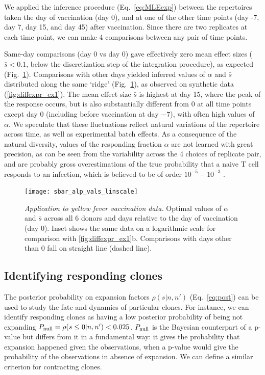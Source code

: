 \documentclass[pre,twocolumn,english,longbibliography]{revtex4}
\newcommand{\<}{\langle}
\renewcommand{\>}{\rangle}
\begin{document}
We applied the inference procedure (Eq.~\ref{eq:MLEexp}) between the repertoires taken the day of vaccination (day 0), and at one of the other time points (day -7, day 7, day 15, and day 45) after vaccination. Since there are two replicates at each time point, we can make 4 comparisons between any pair of time points.

Same-day comparisons (day 0 vs day 0) gave effectively zero mean effect sizes ($\bar s<0.1$, below the discretization step of the integration procedure), as expected (Fig.~\ref{fig:diffexpr_ex2}). Comparisons with other days yielded inferred values of $\alpha$ and $\bar s$ distributed along the same  `ridge' (Fig.~\ref{fig:diffexpr_ex2}), as observed on synthetic data (\cref{fig:diffexpr_ex1}). The mean effect size $\bar s$ is highest at day 15, where the peak of the response occurs, but is also substantially different from 0 at all time points except day 0 (including before vaccination at day $-7$), with often high values of $\alpha$. We speculate that these fluctuations reflect natural variations of the repertoire across time, as well as experimental batch effects. As a consequence of the natural diversity, 
values of the responding fraction $\alpha$ are not learned with great precision, as can be seen from the variability across the 4 choices of replicate pair, and are probably gross overestimations of the true probability that a naive T cell responds to an infection, which is believed to be of order $10^{-5}-10^{-3}$ \cite{Boer1993}.

\begin{figure}
\texttt{[image: sbar\_alp\_vals\_linscale]}
\centering{}
\caption{
\emph{Application to yellow fever vaccination data.} Optimal values of $\alpha$ and $\bar{s}$ across all 6 donors and days relative to the day of vaccination (day 0). Inset shows the same data on a logarithmic scale for comparison with \cref{fig:diffexpr_ex1}b. Comparisons with days other than 0 fall on straight line (dashed line).
\label{fig:diffexpr_ex2}
}
\end{figure}


\subsection*{Identifying responding clones}

The posterior probability on expansion factors $\rho(s|n,n')$ (Eq.~\ref{eq:post}) can be used to
study the fate and dynamics of particular clones. For instance, we can
identify responding clones as having a low posterior probability of being not expanding $P_{\rm null}=\rho(s\leq 0|n,n')<0.025$. $P_{\rm null}$ is the Bayesian counterpart of a p-value but differs from it in a fundamental way: it gives the probability that expansion happened given the observations, when a p-value would give the probability of the observations in absence of expansion.  We can define a similar criterion for contracting clones.
\end{document}
